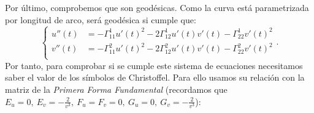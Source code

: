 Por último, comprobemos que son geodésicas. Como la curva está parametrizada por
longitud de arco, será geodésica si cumple que:
\[
\begin{cases}
    u''\left( t \right) &= - \Gamma_{11}^1 u'\left( t \right)^2 - 2 \Gamma_{12}^1
    u'\left( t \right) v'\left( t \right) - \Gamma_{22}^1 v'\left( t \right)^2\\
    v''\left( t \right) &= - \Gamma_{11}^2 u'\left( t \right)^2 - 2 \Gamma_{12}^2
    u'\left( t \right) v'\left( t \right) - \Gamma_{22}^2 v'\left( t \right)^2\\
\end{cases}.
\]
Por tanto, para comprobar si se cumple este sistema de ecuaciones necesitamos saber el valor
de los símbolos de Christoffel. Para ello usamos su relación con la
matriz de la \textit{Primera Forma Fundamental} (recordamos que $E_u = 0,\ E_v =
-\frac{2}{v^3},\ F_u = F_v = 0,\ G_u = 0,\ G_v = - \frac{2}{v^3}$):
